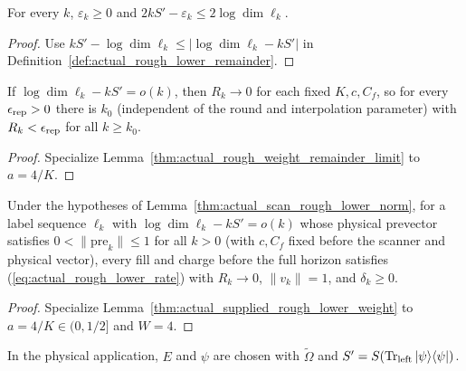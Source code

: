 \begin{lemma}
    \label{thm:actual_rough_lower_label_defect}
    \leanok
    For every $k$, $\varepsilon_k\geq0$ and
    $2kS'-\varepsilon_k\leq2\log\dim\ell_k$.
\end{lemma}
\begin{proof}
    \leanok
    Use $kS'-\log\dim\ell_k\leq|\log\dim\ell_k-kS'|$ in
    Definition~\ref{def:actual_rough_lower_remainder}.
\end{proof}

\begin{lemma}
    \label{thm:actual_rough_lower_remainder_limit}
    \leanok
    If $\log\dim\ell_k-kS'=o(k)$, then $R_k\to0$ for each fixed $K,c,C_f$, so
    for every $\epsilon_{\rm rep}>0$ there is $k_0$ (independent of the round
    and interpolation parameter) with $R_k<\epsilon_{\rm rep}$ for all
    $k\geq k_0$.
\end{lemma}
\begin{proof}
    \leanok
    Specialize Lemma~\ref{thm:actual_rough_weight_remainder_limit} to
    $a=4/K$.
\end{proof}

\begin{lemma}
    \label{thm:actual_scan_supplied_prevector_rough_lower}
    \leanok
    Under the hypotheses of Lemma~\ref{thm:actual_scan_rough_lower_norm}, for
    a label sequence $\ell_k$ with $\log\dim\ell_k-kS'=o(k)$ whose physical
    prevector satisfies $0<\|\mathrm{pre}_k\|\leq1$ for all $k>0$ (with $c,C_f$
    fixed before the scanner and physical vector), every fill and charge before
    the full horizon satisfies (\ref{eq:actual_rough_lower_rate}) with
    $R_k\to0$, $\|v_k\|=1$, and $\delta_k\geq0$.
\end{lemma}
\begin{proof}
    \leanok
    Specialize Lemma~\ref{thm:actual_supplied_rough_lower_weight} to
    $a=4/K\in(0,1/2]$ and $W=4$.
\end{proof}

In the physical application, $E$ and $\psi$ are chosen with $\widetilde\Omega$
and $S'=S(\operatorname{Tr}_{\rm left}|\psi\rangle\langle\psi|)$.
